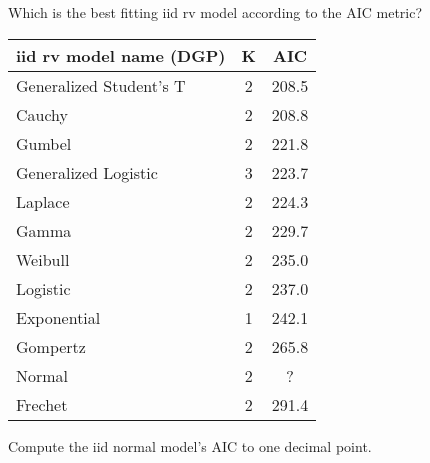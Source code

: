 \documentclass[12pt]{article}
\begin{document}
\begin{enumerate}[(a)]

 Which is the best fitting iid rv model according to the AIC metric? 

\iftoggle{solutions}{\inred{
Generalized Student's T
}}{~\spc{1}}\pagebreak


\begin{table}[htp]
    \centering\small
    \begin{tabular}{l|c|c}
        iid rv model name (DGP) & K & AIC \\ \hline
Generalized Student's T   & 2 &        208.5\\
Cauchy & 2 &      208.8\\
Gumbel & 2 &      221.8\\
Generalized Logistic & 3 &   223.7 \\
Laplace & 2 &     224.3\\
Gamma & 2 &       229.7\\
Weibull & 2 &     235.0\\
Logistic & 2 &    237.0\\
Exponential& 1 &  242.1\\
Gompertz & 2 &    265.8\\
Normal & 2 &      ?\\
Frechet  & 2 &    291.4
    \end{tabular}
\end{table}
 Compute the iid normal model's AIC to one decimal point.

\iftoggle{solutions}{\inred{
First we note that $\doublehat{\theta}^{MLE} = \xbar = 4.06$ and $\doublehat{\sigsq}^{MLE} = \frac{n-1}{n} s^2 = \frac{49}{50} \cdot 13.75 = 13.475$. Using these quantities we can compute AIC from scratch:

\beqn
AIC &=& -2\ell\parens{\doublehat{\theta}^{MLE}, \doublehat{\sigsq}^{MLE}\,;\,\x} + 2k \\
&=& -2\natlog{\prod_{i=1}^n \oneover{\sqrt{2\pi \doublehat{\sigsq}^{MLE}}} e^{- 1/\parens{2 \doublehat{\sigsq}^{MLE}}} (x_i - \doublehat{\theta}^{MLE})^2}
 + 2k\\
&=& n\natlog{2\pi} + n \natlog{\doublehat{\sigsq}^{MLE}} + \inverse{\doublehat{\sigsq}^{MLE}} \sum_{i=1}^n  (x_i - \xbar)^2 + 2k \\
&=& n\natlog{2\pi} + n \natlog{\doublehat{\sigsq}^{MLE}} + \frac{(n-1)s^2}{\doublehat{\sigsq}^{MLE}} + 2k \\
&=& 50 \natlog{6.283} + 50 \natlog{13.475} + \frac{49 \cdot 13.75}{13.475} + 2 \cdot 2 \\
&=& 275.9
\eeqn

}}{~\spc{20}} \pagebreak



\end{enumerate}
\end{document}
